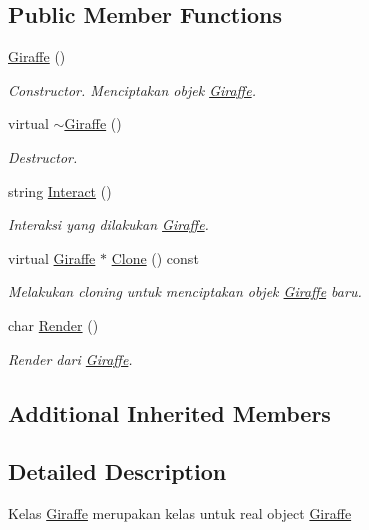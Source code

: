 \subsection*{Public Member Functions}
\begin{DoxyCompactItemize}
\item 
\hyperlink{classGiraffe_a4a396bd3e634243c1740916b71197168}{Giraffe} ()
\begin{DoxyCompactList}\small\item\em Constructor. Menciptakan objek \hyperlink{classGiraffe}{Giraffe}. \end{DoxyCompactList}\item 
virtual \hyperlink{classGiraffe_a1d099c4a2c87fbac26e5bcb33084dcb4}{$\sim$\+Giraffe} ()
\begin{DoxyCompactList}\small\item\em Destructor. \end{DoxyCompactList}\item 
string \hyperlink{classGiraffe_ad73e5ee5fc62f709c52a1cab68f2a1f3}{Interact} ()
\begin{DoxyCompactList}\small\item\em Interaksi yang dilakukan \hyperlink{classGiraffe}{Giraffe}. \end{DoxyCompactList}\item 
virtual \hyperlink{classGiraffe}{Giraffe} $\ast$ \hyperlink{classGiraffe_aa29f8f77477a64fc72f814b7f225c94f}{Clone} () const 
\begin{DoxyCompactList}\small\item\em Melakukan cloning untuk menciptakan objek \hyperlink{classGiraffe}{Giraffe} baru. \end{DoxyCompactList}\item 
char \hyperlink{classGiraffe_a64dccf030fdb54de9fd37f8381c64271}{Render} ()
\begin{DoxyCompactList}\small\item\em Render dari \hyperlink{classGiraffe}{Giraffe}. \end{DoxyCompactList}\end{DoxyCompactItemize}
\subsection*{Additional Inherited Members}


\subsection{Detailed Description}
Kelas \hyperlink{classGiraffe}{Giraffe} merupakan kelas untuk real object \hyperlink{classGiraffe}{Giraffe} 

